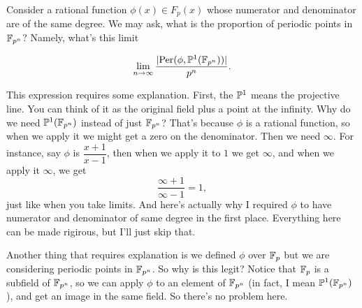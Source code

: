 Consider a rational function $\phi(x) \in F_p(x)$ whose numerator and
denominator are of the same degree. We may ask, what is the
proportion of periodic points in $\F_{p^n}$? Namely, what's this limit

\[
\lim_{n \to \infty} \frac{|\mathrm{Per}(\phi, \P^1(\F_{p^n}))|}{p^n}.
\]

This expression requires some explanation. First, the $\P^1$ means the
projective line. You can think of it as the original field plus a
point at the infinity. Why do we need $\P^1(\F_{p^n})$ instead of just
$\F_{p^n}$? That's because $\phi$ is a rational function, so when we
apply it we might get a zero on the denominator. Then we need
$\infty$. For instance, say $\phi$ is $\dfrac{x+1}{x-1}$, then when we
apply it to $1$ we get $\infty$, and when we apply it $\infty$, we get
\[
\frac{\infty + 1}{\infty - 1} = 1,
\]
just like when you take limits. And here's actually why I required $\phi$ to
have numerator and denominator of same degree in the first
place. Everything here can be made rigirous, but I'll just skip that.

Another thing that requires explanation is we defined $\phi$ over
$\F_p$ but we are considering periodic points in $\F_{p^n}$. So why is
this legit?  Notice that $\F_p$ is a subfield of $\F_{p^n}$, so we can
apply $\phi$ to an element of $\F_{p^n}$ (in fact, I mean
$\P^1(\F_{p^n})$), and get an image in the same field. So there's no
problem here.


